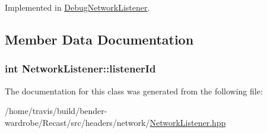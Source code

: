 Implemented in \hyperlink{class_debug_network_listener_a320f61476c1bacc235594731e39c51ff}{Debug\-Network\-Listener}.



\subsection{Member Data Documentation}
\hypertarget{class_network_listener_a5333c0bb22a8a931693bc85ff09aa090}{
\subsubsection[{listener\-Id}]{\setlength{\rightskip}{0pt plus 5cm}int Network\-Listener\-::listener\-Id\hspace{0.3cm}{\ttfamily [protected]}}}\label{class_network_listener_a5333c0bb22a8a931693bc85ff09aa090}


The documentation for this class was generated from the following file\-:\begin{DoxyCompactItemize}
\item 
/home/travis/build/bender-\/wardrobe/\-Recast/src/headers/network/\hyperlink{_network_listener_8hpp}{Network\-Listener.\-hpp}\end{DoxyCompactItemize}
